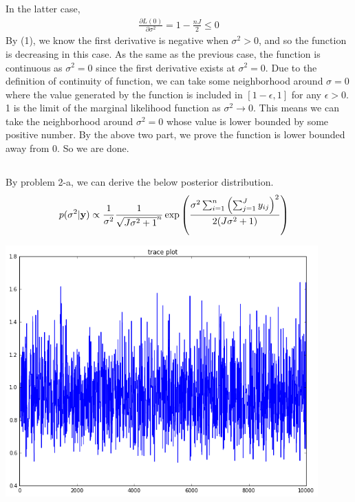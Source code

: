 \documentclass{article}
\begin{document}
		\par
		In the latter case, 
		\begin{align*}
			\frac{\partial L(0)}{\partial \sigma^2} = 1 - \frac{nJ}{2} \leq 0
		\end{align*}
		By (1), we know the first derivative is negative when $\sigma^2 > 0$, and so the function is decreasing in this case. As the same as the previous case, the function is continuous as $\sigma^2 = 0$ since the first derivative exists at $\sigma^2 = 0$. Due to the definition of continuity of function, we can take some neighborhood around $\sigma = 0$ where the value generated by the function is included in $[1 - \epsilon, 1]$  for any $\epsilon > 0$. 1 is the limit of the marginal likelihood function as $\sigma^2 \to 0$. This means we can take the neighborhood around $\sigma^2 = 0$ whose value is lower bounded by some positive number.
		By the above two part, we prove the function is lower bounded away from 0. So we are done.
	\subsection{}
	By problem 2-a, we can derive the below posterior distribution.
		\begin{align*}
		p(\sigma^2 | {\bf y}) &\propto \frac{1}{\sigma^2} \frac{1}{\sqrt{J\sigma^2 + 1}^n} \exp \left( \frac{\sigma^2 \sum_{i=1}^{n} \left( \sum_{j=1}^{J} y_{ij}\right)^2}{2(J\sigma^2+ 1)}\right)
		\end{align*}
		
		\begin{center}
		\includegraphics[width = 12cm]{2-c.png}
		\end{center}		
\end{document}
